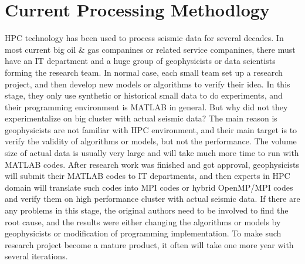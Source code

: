 \section{Current Processing Methodlogy}
HPC technology has been used to process seismic data for several decades. In most current big oil \& gas companines or related service companines, there must have an IT department and a huge group of geophysicists or data scientists forming the research team. In normal case, each small team set up a research project, and then develop new models or algorithms to verify their idea. In this stage, they only use synthetic or historical small data to do experiments, and their programming environment is MATLAB in general. But why did not they experimentalize on big cluster with actual seismic data? The main reason is geophysicists are not familiar with HPC environment, and their main target is to verify the validity of algorithms or models, but not the performance. The volume size of actual data is usually very large and will take much more time to run with MATLAB codes. After research work was finished and got approval, geophysicists will submit their MATLAB codes to IT departments, and then experts in HPC domain will translate such codes into MPI codes or hybrid OpenMP/MPI codes and verify them on high performance cluster with actual seismic data. If there are any problems in this stage, the original authors need to be involved to find the root cause, and the results were either changing the algorithms or models by geophysicists or modification of programming implementation. To make such research project become a mature product, it often will take one more year with several iterations.



